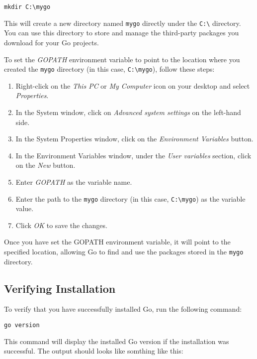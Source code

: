 \begin{lstlisting}[numbers=none]
mkdir C:\mygo
\end{lstlisting}

This will create a new directory named \texttt{mygo} directly under
the \texttt{C:\textbackslash} directory. You can use this directory to store and
manage the third-party packages you download for your Go projects.

To set the \textit{GOPATH} environment variable to point to the location where
you created the \texttt{mygo} directory (in this case,
\texttt{C:\textbackslash mygo}), follow these steps:

\begin{enumerate}
    \item Right-click on the \textit{This PC} or \textit{My Computer} icon on your desktop and select \textit{Properties}.
    \item In the System window, click on \textit{Advanced system settings} on the left-hand side.
    \item In the System Properties window, click on the \textit{Environment Variables} button.
    \item In the Environment Variables window, under the \textit{User variables} section, click on the \textit{New} button.
    \item Enter \textit{GOPATH} as the variable name.
    \item Enter the path to the \texttt{mygo} directory (in this case, \texttt{C:\textbackslash mygo}) as the variable value.
    \item Click \textit{OK} to save the changes.
\end{enumerate}

Once you have set the GOPATH environment variable, it will point to the
specified location, allowing Go to find and use the packages stored in the
\texttt{mygo} directory.

\subsection{Verifying Installation}

To verify that you have successfully installed Go, run the following command:

\begin{lstlisting}[numbers=none]
go version
\end{lstlisting}

This command will display the installed Go version if the installation was
successful. The output should looks like somthing like this:

